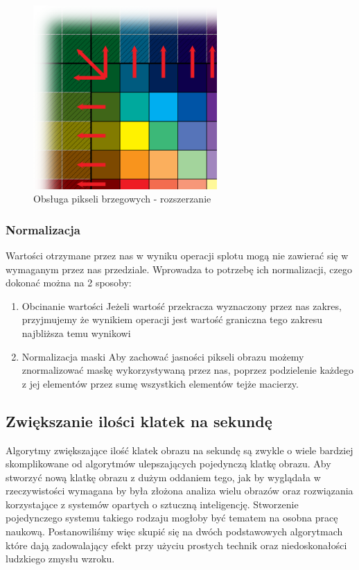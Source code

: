 \documentclass[twoside]{projektInzynierskiMS}
\begin{document}
\begin{enumerate}
	\begin{figure}[h]
		\centering
		\includegraphics[width=7cm]{extending.png}
		\caption{Obsługa pikseli brzegowych - rozszerzanie}
	\end{figure}
\end{enumerate}
\subsubsection{Normalizacja}
Wartości otrzymane przez nas w wyniku operacji splotu mogą nie zawierać się w wymaganym przez nas przedziale. Wprowadza to potrzebę ich normalizacji, czego dokonać można na 2 sposoby:
\begin{enumerate}
	\item Obcinanie wartości
	Jeżeli wartość przekracza wyznaczony przez nas zakres, przyjmujemy że wynikiem operacji jest wartość graniczna tego zakresu najbliższa temu wynikowi
	\item Normalizacja maski
	Aby zachować jasności pikseli obrazu możemy znormalizować maskę wykorzystywaną przez nas, poprzez podzielenie każdego z jej elementów przez sumę wszystkich elementów tejże macierzy.
\end{enumerate}

\subsection{Zwiększanie ilości klatek na sekundę}
Algorytmy zwiększające ilość klatek obrazu na sekundę są zwykle o wiele bardziej skomplikowane od algorytmów ulepszających pojedynczą klatkę obrazu. Aby stworzyć nową klatkę obrazu z dużym oddaniem tego, jak by wyglądała w rzeczywistości wymagana by była złożona analiza wielu obrazów oraz rozwiązania korzystające z systemów opartych o sztuczną inteligencję. Stworzenie pojedynczego systemu takiego rodzaju mogłoby być tematem na osobna pracę naukową. Postanowiliśmy więc skupić się na dwóch podstawowych algorytmach które dają zadowalający efekt przy użyciu prostych technik oraz niedoskonałości ludzkiego zmysłu wzroku.
\end{document}
